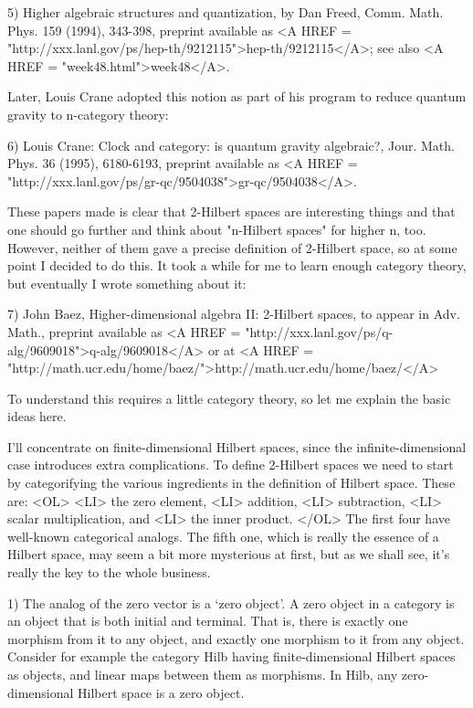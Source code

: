 5) Higher algebraic structures and quantization, by Dan Freed,
Comm. Math. Phys. 159 (1994), 343-398, preprint available as
<A HREF = "http://xxx.lanl.gov/ps/hep-th/9212115">hep-th/9212115</A>; see also <A HREF = "week48.html">week48</A>.

Later, Louis Crane adopted this notion as part of his program to 
reduce quantum gravity to n-category theory:

6) Louis Crane: Clock and category: is quantum gravity algebraic?,
Jour. Math. Phys. 36 (1995), 6180-6193, preprint available as 
<A HREF = "http://xxx.lanl.gov/ps/gr-qc/9504038">gr-qc/9504038</A>.

These papers made is clear that 2-Hilbert spaces are interesting
things and that one should go further and think about "n-Hilbert
spaces" for higher n, too.  However, neither of them gave a precise
definition of 2-Hilbert space, so at some point I decided to do this.
It took a while for me to learn enough category theory, but eventually
I wrote something about it:

7) John Baez, Higher-dimensional algebra II: 2-Hilbert spaces, 
to appear in Adv. Math., preprint available as <A HREF = "http://xxx.lanl.gov/ps/q-alg/9609018">q-alg/9609018</A> or
at <A HREF = "http://math.ucr.edu/home/baez/">http://math.ucr.edu/home/baez/</A>

To understand this requires a little category theory, so let
me explain the basic ideas here.  

I'll concentrate on finite-dimensional Hilbert spaces, since the
infinite-dimensional case introduces extra complications.  To define
2-Hilbert spaces we need to start by categorifying the various
ingredients in the definition of Hilbert space.  These are:
<OL>
<LI>
the zero element, 
<LI>
addition, 
<LI>
subtraction, 
<LI>
scalar multiplication,
and 
<LI>
the inner product. 
</OL>
The first four have well-known categorical
analogs.  The fifth one, which is really the essence of a Hilbert
space, may seem a bit more mysterious at first, but as we shall see,
it's really the key to the whole business.

1) The analog of the zero vector is a `zero object'.  A zero object in
a category is an object that is both initial and terminal.  That is,
there is exactly one morphism from it to any object, and exactly one
morphism to it from any object.  Consider for example the category
Hilb having finite-dimensional Hilbert spaces as objects, and linear
maps between them as morphisms.  In Hilb, any zero-dimensional Hilbert
space is a zero object.

